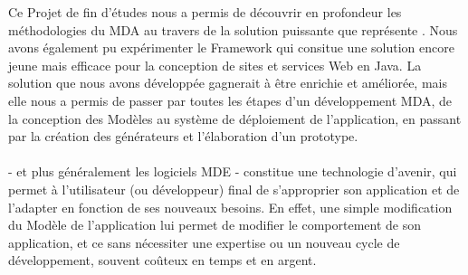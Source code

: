 Ce Projet de fin d'études nous a permis de découvrir en profondeur les méthodologies du MDA au travers de la solution puissante que représente \kwacceleo. Nous avons également pu expérimenter le Framework \kwplay qui consitue une solution encore jeune mais efficace pour la conception de sites et services Web en Java. La solution que nous avons développée gagnerait à être enrichie et améliorée, mais elle nous a permis de passer par toutes les étapes d'un développement MDA, de la conception des Modèles au système de déploiement de l'application, en passant par la création des générateurs et l'élaboration d'un prototype.
\\
\\
\kwacceleo{} - et plus généralement les logiciels MDE - constitue une technologie d'avenir, qui permet à l'utilisateur (ou développeur) final de s'approprier son application et de l'adapter en fonction de ses nouveaux besoins. En effet, une simple modification du Modèle de l'application lui permet de modifier le comportement de son application, et ce sans nécessiter une expertise ou un nouveau cycle de développement, souvent coûteux en temps et en argent.



